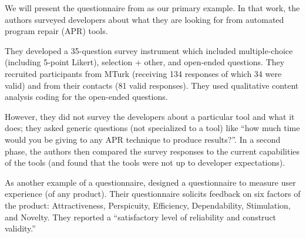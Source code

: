 We will present the questionnaire from
\cite{noller22:_trust_enhan_issues_progr_repair} as our primary
example. In that work, the authors surveyed developers about what they
are looking for from automated program repair (APR) tools.

They developed a
35-question survey instrument which included multiple-choice
(including 5-point Likert), selection + other, and open-ended
questions. They recruited participants from MTurk (receiving 134
responses of which 34 were valid) and from their contacts (81 valid
responses). They used qualitative content analysis coding for the open-ended
questions. 

However, they did not survey the developers about a particular tool
and what it does; they asked generic questions (not specialized to a
tool) like ``how much time would you be giving to any APR technique to
produce results?''. In a second phase, the authors then compared the
survey responses to the current capabilities of the tools (and found
that the tools were not up to developer expectations).

As another example of a questionnaire, 
designed a questionnaire to measure user experience (of any product).
Their questionnaire solicits feedback on
six factors of the product: Attractiveness, Perspicuity, Efficiency, Dependability,
Stimulation, and Novelty. They reported a ``satisfactory level
of reliability and construct validity.''




